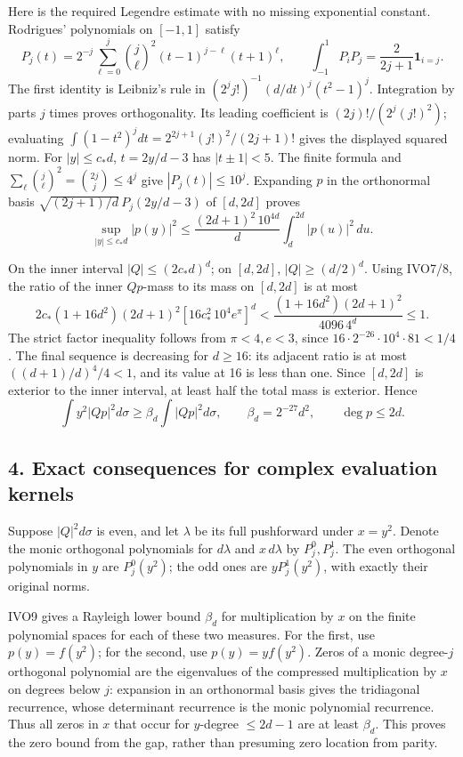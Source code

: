 Here is the required Legendre estimate with no missing exponential constant. Rodrigues' polynomials on \([-1,1]\) satisfy \[
P_j(t)=2^{-j}\sum_{\ell=0}^j\binom j\ell^2(t-1)^{j-\ell}(t+1)^\ell,\qquad
\int_{-1}^1P_iP_j=\frac2{2j+1}\mathbf1_{i=j}.
\] The first identity is Leibniz's rule in \((2^jj!)^{-1}(d/dt)^j(t^2-1)^j\). Integration by parts \(j\) times proves orthogonality. Its leading coefficient is \((2j)!/(2^j(j!)^2)\); evaluating \(\int(1-t^2)^jdt=2^{2j+1}(j!)^2/(2j+1)!\) gives the displayed squared norm. For \(|y|\le c_*d\), \(t=2y/d-3\) has \(|t\pm1|<5\). The finite formula and \(\sum_\ell\binom j\ell^2=\binom{2j}j\le4^j\) give \(|P_j(t)|\le10^j\). Expanding \(p\) in the orthonormal basis \(\sqrt{(2j+1)/d}\,P_j(2y/d-3)\) of \([d,2d]\) proves \[
\sup_{|y|\le c_*d}|p(y)|^2
\le\frac{(2d+1)^2\,10^{4d}}d\int_d^{2d}|p(u)|^2\,du.
\tag{IVO8}
\]

On the inner interval \(|Q|\le(2c_*d)^d\); on \([d,2d]\), \(|Q|\ge(d/2)^d\). Using IVO7/8, the ratio of the inner \(Qp\)-mass to its mass on \([d,2d]\) is at most \[
2c_*(1+16d^2)(2d+1)^2
[16c_*^2\,10^4e^\pi]^d
<\frac{(1+16d^2)(2d+1)^2}{4096\,4^d}\le1.
\] The strict factor inequality follows from \(\pi<4,e<3\), since \(16\cdot2^{-26}\cdot10^4\cdot81<1/4\). The final sequence is decreasing for \(d\ge16\): its adjacent ratio is at most \(((d+1)/d)^4/4<1\), and its value at 16 is less than one. Since \([d,2d]\) is exterior to the inner interval, at least half the total mass is exterior. Hence \[
\int y^2|Qp|^2d\sigma\ge\beta_d\int|Qp|^2d\sigma,\qquad
\beta_d=2^{-27}d^2,\qquad\deg p\le2d.
\tag{IVO9}
\]

\subsection{4. Exact consequences for complex evaluation kernels}\label{exact-consequences-for-complex-evaluation-kernels}

Suppose \(|Q|^2d\sigma\) is even, and let \(\lambda\) be its full pushforward under \(x=y^2\). Denote the monic orthogonal polynomials for \(d\lambda\) and \(x\,d\lambda\) by \(P_j^0,P_j^1\). The even orthogonal polynomials in \(y\) are \(P_j^0(y^2)\); the odd ones are \(yP_j^1(y^2)\), with exactly their original norms.

IVO9 gives a Rayleigh lower bound \(\beta_d\) for multiplication by \(x\) on the finite polynomial spaces for each of these two measures. For the first, use \(p(y)=f(y^2)\); for the second, use \(p(y)=yf(y^2)\). Zeros of a monic degree-\(j\) orthogonal polynomial are the eigenvalues of the compressed multiplication by \(x\) on degrees below \(j\): expansion in an orthonormal basis gives the tridiagonal recurrence, whose determinant recurrence is the monic polynomial recurrence. Thus all zeros in \(x\) that occur for \(y\)-degree \(\le2d-1\) are at least \(\beta_d\). This proves the zero bound from the gap, rather than presuming zero location from parity.

